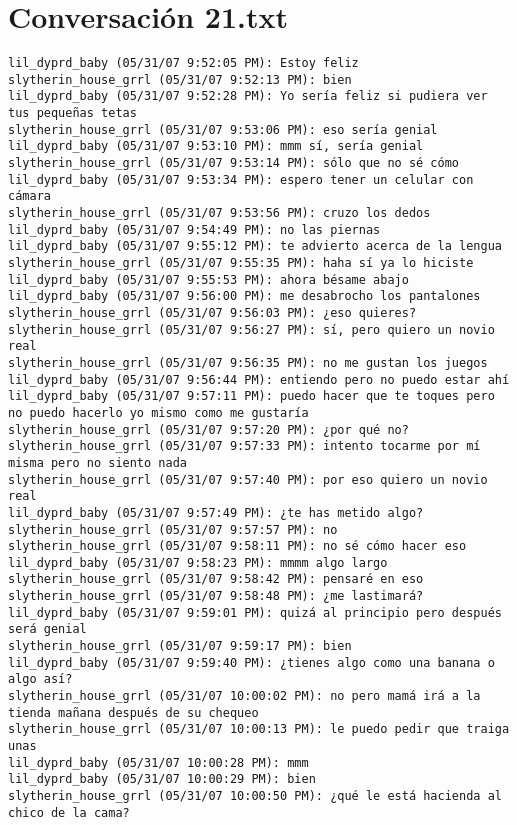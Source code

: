 \section{Conversaci\'on 21.txt}

\begin{verbatim}
lil_dyprd_baby (05/31/07 9:52:05 PM): Estoy feliz
slytherin_house_grrl (05/31/07 9:52:13 PM): bien
lil_dyprd_baby (05/31/07 9:52:28 PM): Yo sería feliz si pudiera ver tus pequeñas tetas
slytherin_house_grrl (05/31/07 9:53:06 PM): eso sería genial
lil_dyprd_baby (05/31/07 9:53:10 PM): mmm sí, sería genial
slytherin_house_grrl (05/31/07 9:53:14 PM): sólo que no sé cómo
lil_dyprd_baby (05/31/07 9:53:34 PM): espero tener un celular con cámara
slytherin_house_grrl (05/31/07 9:53:56 PM): cruzo los dedos
lil_dyprd_baby (05/31/07 9:54:49 PM): no las piernas 
lil_dyprd_baby (05/31/07 9:55:12 PM): te advierto acerca de la lengua 
slytherin_house_grrl (05/31/07 9:55:35 PM): haha sí ya lo hiciste
lil_dyprd_baby (05/31/07 9:55:53 PM): ahora bésame abajo
lil_dyprd_baby (05/31/07 9:56:00 PM): me desabrocho los pantalones
slytherin_house_grrl (05/31/07 9:56:03 PM): ¿eso quieres? 
slytherin_house_grrl (05/31/07 9:56:27 PM): sí, pero quiero un novio real
slytherin_house_grrl (05/31/07 9:56:35 PM): no me gustan los juegos
lil_dyprd_baby (05/31/07 9:56:44 PM): entiendo pero no puedo estar ahí
lil_dyprd_baby (05/31/07 9:57:11 PM): puedo hacer que te toques pero no puedo hacerlo yo mismo como me gustaría
slytherin_house_grrl (05/31/07 9:57:20 PM): ¿por qué no?
slytherin_house_grrl (05/31/07 9:57:33 PM): intento tocarme por mí misma pero no siento nada
slytherin_house_grrl (05/31/07 9:57:40 PM): por eso quiero un novio real
lil_dyprd_baby (05/31/07 9:57:49 PM): ¿te has metido algo?
slytherin_house_grrl (05/31/07 9:57:57 PM): no
slytherin_house_grrl (05/31/07 9:58:11 PM): no sé cómo hacer eso
lil_dyprd_baby (05/31/07 9:58:23 PM): mmmm algo largo
slytherin_house_grrl (05/31/07 9:58:42 PM): pensaré en eso
slytherin_house_grrl (05/31/07 9:58:48 PM): ¿me lastimará?
lil_dyprd_baby (05/31/07 9:59:01 PM): quizá al principio pero después será genial
slytherin_house_grrl (05/31/07 9:59:17 PM): bien
lil_dyprd_baby (05/31/07 9:59:40 PM): ¿tienes algo como una banana o algo así?
slytherin_house_grrl (05/31/07 10:00:02 PM): no pero mamá irá a la tienda mañana después de su chequeo
slytherin_house_grrl (05/31/07 10:00:13 PM): le puedo pedir que traiga unas 
lil_dyprd_baby (05/31/07 10:00:28 PM): mmm
lil_dyprd_baby (05/31/07 10:00:29 PM): bien
slytherin_house_grrl (05/31/07 10:00:50 PM): ¿qué le está hacienda al chico de la cama?

\end{verbatim}
